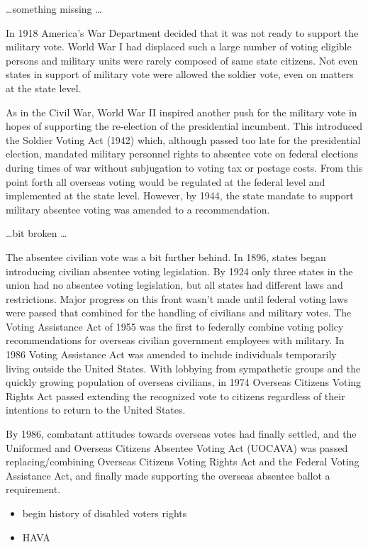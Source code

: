 \ldots something missing \ldots

In 1918 America's War Department decided that it was not ready to support the military vote. World War I had displaced such a large number of voting eligible persons and military units were rarely composed of same state citizens. Not even states in support of military vote were allowed the soldier vote, even on matters at the state level.

As in the Civil War, World War II inspired another push for the military vote in hopes of supporting the re-election of the presidential incumbent. This introduced the Soldier Voting Act (1942) which, although passed too late for the presidential election, mandated military personnel rights to absentee vote on federal elections during times of war without subjugation to voting tax or postage costs. From this point forth all overseas voting would be regulated at the federal level and implemented at the state level. However, by 1944, the state mandate to support military absentee voting was amended to a recommendation.

\ldots bit broken \ldots

The absentee civilian vote was a bit further behind. In 1896, states began introducing civilian absentee voting legislation. By 1924 only three states in the union had no absentee voting legislation, but all states had different laws and restrictions. Major progress on this front wasn't made until federal voting laws were passed that combined for the handling of civilians and military votes. The Voting Assistance Act of 1955 was the first to federally combine voting policy recommendations for overseas civilian government employees with military. In 1986 Voting Assistance Act was amended to include individuals temporarily living outside the United States. With lobbying from sympathetic groups and the quickly growing population of overseas civilians, in 1974 Overseas Citizens Voting Rights Act passed extending the recognized vote to citizens regardless of their intentions to return to the United States.

By 1986, combatant attitudes towards overseas votes had finally settled, and the Uniformed and Overseas Citizens Absentee Voting Act (UOCAVA) was passed replacing/combining Overseas Citizens Voting Rights Act and the Federal Voting Assistance Act, and finally made supporting the overseas absentee ballot a requirement.

\begin{itemize}
\item begin history of disabled voters rights
\item HAVA 
\end{itemize}


